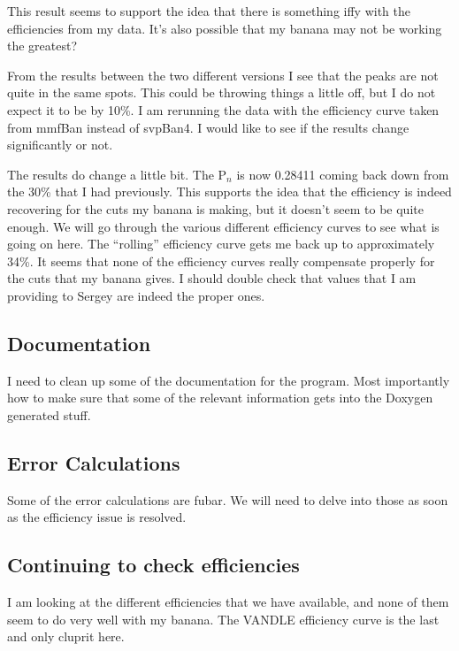 This result seems to support the idea that there is something iffy with the 
efficiencies from my data. It's also possible that my banana may not be 
working the greatest? 

From the results between the two different versions I see that the peaks 
are not quite in the same spots. This could be throwing things a little 
off, but I do not expect it to be by 10\%. I am rerunning the data with 
the efficiency curve taken from mmfBan instead of svpBan4. I would like to 
see if the results change significantly or not. 

The results do change a little bit. The P$_n$ is now 0.28411 coming back down 
from the 30\% that I had previously. This supports the idea that the efficiency
is indeed recovering for the cuts my banana is making, but it doesn't seem to 
be quite enough. We will go through the various different efficiency curves to 
see what is going on here. The ``rolling'' efficiency curve gets me back up to 
approximately 34\%. It seems that none of the efficiency curves really 
compensate properly for the cuts that my banana gives. I should double check 
that values that I am providing to Sergey are indeed the proper ones. 

\subsection{Documentation}
I need to clean up some of the documentation for the program. Most importantly 
how to make sure that some of the relevant information gets into the Doxygen 
generated stuff. 

\subsection{Error Calculations}
Some of the error calculations are fubar. We will need to delve into those as 
soon as the efficiency issue is resolved. 

\subsection{Continuing to check efficiencies}
I am looking at the different efficiencies that we have available, and none of 
them seem to do very well with my banana. The VANDLE efficiency curve is the 
last and only cluprit here. 

